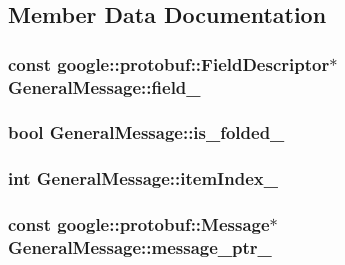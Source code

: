 \subsection{Member Data Documentation}
\hypertarget{classGeneralMessage_adde304145c9d3c9183ecdab343cecbcb}{
\subsubsection[{field\-\_\-}]{\setlength{\rightskip}{0pt plus 5cm}const google\-::protobuf\-::\-Field\-Descriptor$\ast$ General\-Message\-::field\-\_\-\hspace{0.3cm}{\ttfamily [private]}}}\label{classGeneralMessage_adde304145c9d3c9183ecdab343cecbcb}
\hypertarget{classGeneralMessage_aa4574eb1aa08869087923fadcc7c8ea1}{
\subsubsection[{is\-\_\-folded\-\_\-}]{\setlength{\rightskip}{0pt plus 5cm}bool General\-Message\-::is\-\_\-folded\-\_\-\hspace{0.3cm}{\ttfamily [private]}}}\label{classGeneralMessage_aa4574eb1aa08869087923fadcc7c8ea1}
\hypertarget{classGeneralMessage_a5a14f5070ecf60e853ff57de0eb14cbe}{
\subsubsection[{item\-Index\-\_\-}]{\setlength{\rightskip}{0pt plus 5cm}int General\-Message\-::item\-Index\-\_\-\hspace{0.3cm}{\ttfamily [private]}}}\label{classGeneralMessage_a5a14f5070ecf60e853ff57de0eb14cbe}
\hypertarget{classGeneralMessage_a2190da87b7dd7402133992d44fb98230}{
\subsubsection[{message\-\_\-ptr\-\_\-}]{\setlength{\rightskip}{0pt plus 5cm}const google\-::protobuf\-::\-Message$\ast$ General\-Message\-::message\-\_\-ptr\-\_\-\hspace{0.3cm}{\ttfamily [private]}}}\label{classGeneralMessage_a2190da87b7dd7402133992d44fb98230}
